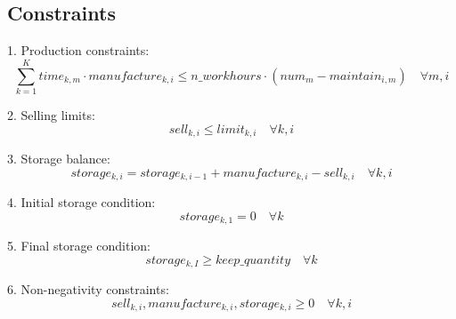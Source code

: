 \documentclass{article}
\begin{document}
\subsection*{Constraints}
1. Production constraints:
\[
\sum_{k=1}^{K} time_{k, m} \cdot manufacture_{k, i} \leq n\_workhours \cdot (num_{m} - maintain_{i, m}) \quad \forall m, i
\]

2. Selling limits:
\[
sell_{k, i} \leq limit_{k, i} \quad \forall k, i
\]

3. Storage balance:
\[
storage_{k, i} = storage_{k, i-1} + manufacture_{k, i} - sell_{k, i} \quad \forall k, i
\]

4. Initial storage condition:
\[
storage_{k, 1} = 0 \quad \forall k
\]

5. Final storage condition:
\[
storage_{k, I} \geq keep\_quantity \quad \forall k
\]

6. Non-negativity constraints:
\[
sell_{k, i}, manufacture_{k, i}, storage_{k, i} \geq 0 \quad \forall k, i
\]
\end{document}
